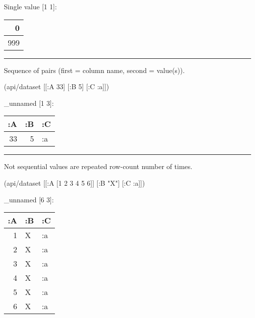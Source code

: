 \documentclass[]{article}
\newenvironment{Shaded}{\begin{snugshade}}{\end{snugshade}}
\newcommand{\DecValTok}[1]{\textcolor[rgb]{0.00,0.00,0.81}{#1}}
\newcommand{\StringTok}[1]{\textcolor[rgb]{0.31,0.60,0.02}{#1}}
\newcommand{\AttributeTok}[1]{\textcolor[rgb]{0.77,0.63,0.00}{#1}}
\newcommand{\NormalTok}[1]{#1}
\begin{document}
Single value {[}1 1{]}:

\begin{longtable}[]{@{}r@{}}
\toprule
0\tabularnewline
\midrule
\endhead
999\tabularnewline
\bottomrule
\end{longtable}

\begin{center}\rule{0.5\linewidth}{0.5pt}\end{center}

Sequence of pairs (first = column name, second = value(s)).

\begin{Shaded}
\begin{Highlighting}[]
\NormalTok{(api/dataset [[}\AttributeTok{:A} \DecValTok{33}\NormalTok{] [}\AttributeTok{:B} \DecValTok{5}\NormalTok{] [}\AttributeTok{:C} \AttributeTok{:a}\NormalTok{]])}
\end{Highlighting}
\end{Shaded}

\_unnamed {[}1 3{]}:

\begin{longtable}[]{@{}rrl@{}}
\toprule
:A & :B & :C\tabularnewline
\midrule
\endhead
33 & 5 & :a\tabularnewline
\bottomrule
\end{longtable}

\begin{center}\rule{0.5\linewidth}{0.5pt}\end{center}

Not sequential values are repeated row-count number of times.

\begin{Shaded}
\begin{Highlighting}[]
\NormalTok{(api/dataset [[}\AttributeTok{:A}\NormalTok{ [}\DecValTok{1} \DecValTok{2} \DecValTok{3} \DecValTok{4} \DecValTok{5} \DecValTok{6}\NormalTok{]] [}\AttributeTok{:B} \StringTok{"X"}\NormalTok{] [}\AttributeTok{:C} \AttributeTok{:a}\NormalTok{]])}
\end{Highlighting}
\end{Shaded}

\_unnamed {[}6 3{]}:

\begin{longtable}[]{@{}rll@{}}
\toprule
:A & :B & :C\tabularnewline
\midrule
\endhead
1 & X & :a\tabularnewline
2 & X & :a\tabularnewline
3 & X & :a\tabularnewline
4 & X & :a\tabularnewline
5 & X & :a\tabularnewline
6 & X & :a\tabularnewline
\bottomrule
\end{longtable}
\end{document}
